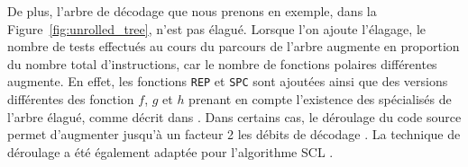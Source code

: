 De plus, l'arbre de décodage que nous prenons en exemple, dans la Figure~\ref{fig:unrolled_tree}, n'est pas élagué. Lorsque l'on ajoute l'élagage, le nombre de tests effectués au cours du parcours de l'arbre augmente en proportion du nombre total d'instructions, car le nombre de fonctions polaires différentes augmente. En effet, les fonctions \texttt{REP} et \texttt{SPC} sont ajoutées ainsi que des versions différentes des fonction $f$, $g$ et $h$ prenant en compte l'existence des \noeuds spécialisés de l'arbre élagué, comme décrit dans \cite{sarkis_fast_2014,cassagne_efficient_2015}. Dans certains cas, le déroulage du code source permet d'augmenter jusqu'à un facteur 2 les débits de décodage \cite{sarkis_autogenerating_2014}. La technique de déroulage a été également adaptée pour l'algorithme SCL \cite{sarkis_fast_2016}.

